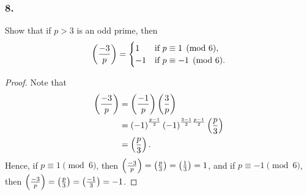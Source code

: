 \subsubsection{8.} Show that if $p>3$ is an odd prime, then
\[
    \left(\frac{-3}{p}\right) = \begin{cases}
        1 & \mbox{if } p \equiv 1 \pmod{6}, \\
        -1 & \mbox{if }p \equiv -1 \pmod{6}.
    \end{cases}
\]
\begin{proof}
    Note that
    \begin{align*}
        \left(\frac{-3}{p}\right) &= \left(\frac{-1}{p}\right)\left(\frac{3}{p}\right) \\
        &= \left(-1\right)^{\frac{p-1}{2}}\left(-1\right)^{\frac{3-1}{2}\frac{p-1}{2}}\left(\frac{p}{3}\right) \\
        &= \left(\frac{p}{3}\right).
    \end{align*}
    Hence, if $p \equiv 1 \pmod{6}$, then $\left(\frac{-3}{p}\right)=\left(\frac{p}{3}\right)=\left(\frac{1}{3}\right)=1$,
    and if $p \equiv -1 \pmod{6}$, then $\left(\frac{-3}{p}\right)=\left(\frac{p}{3}\right)=\left(\frac{-1}{3}\right)=-1$.
\end{proof}


